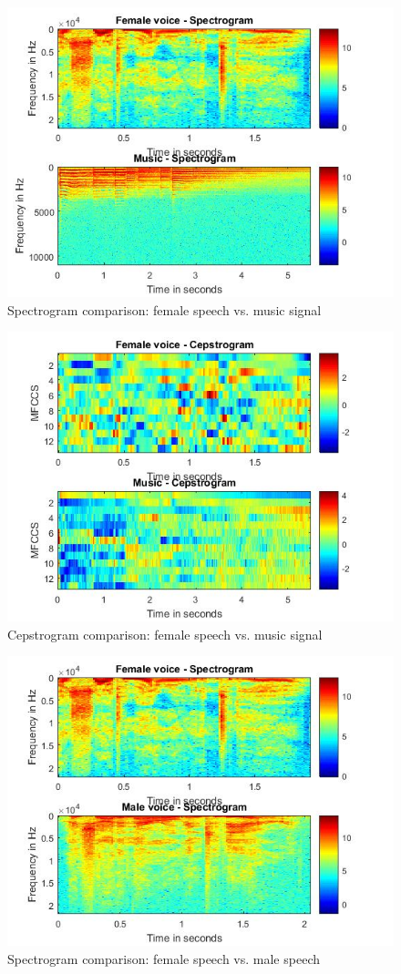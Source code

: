 \begin{figure}[h]
		\centering
		\includegraphics[width=0.77\linewidth]{./images/7.jpg}
		\caption{Spectrogram comparison: female speech vs. music signal}
		\label{fig:7}	
\end{figure}
\begin{figure}[h]
		\centering
		\includegraphics[width=0.75\linewidth, keepaspectratio]{./images/8.jpg}
		\caption{Cepstrogram comparison: female speech vs. music signal}
		\label{fig:8}	
\end{figure}
\pagebreak
\begin{figure}[h]
		\centering
		\includegraphics[width=0.75\linewidth, keepaspectratio]{./images/9.jpg}
		\caption{Spectrogram comparison: female speech vs. male speech}
		\label{fig:9}	
\end{figure}
